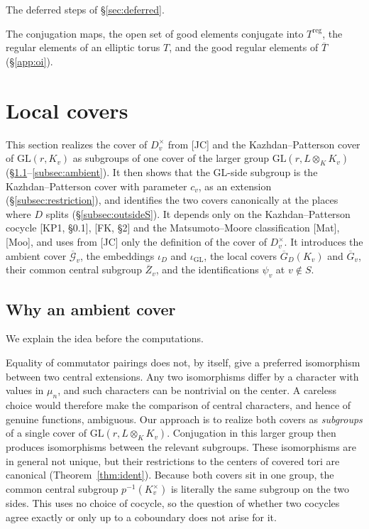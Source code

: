 \documentclass[12pt]{article}
\newcommand{\ov}[1]{\overline{#1}}
\newcommand{\reg}{\mathrm{reg}}
\newcommand{\GL}{\mathrm{GL}}
\newcommand{\Gb}{\ov{G}}
\newcommand{\Zb}{\ov{Z}}
\newcommand{\GDb}{\ov{G}_D}
\newcommand{\Tb}{\ov{T}}
\newcommand{\cGb}{\ov{\mathcal{G}}}
\newcommand{\iD}{\iota_D}
\newcommand{\iG}{\iota_{\GL}}
\theoremstyle{plain}
\theoremstyle{definition}
\begin{document}
\begin{description}[style=nextline,leftmargin=1.5em]
\item[(D1)--(D4)] The deferred steps of \S\ref{sec:deferred}.
\item[$\Psi$, $\tilde\Psi$, $\Gb_T$, $T^{\reg}$, $\Tb^{g,\reg}$] The conjugation maps, the open set of good elements conjugate into $T^{\reg}$, the regular elements of an elliptic torus $T$, and the good regular elements of $\Tb$ (\S\ref{app:oi}).
\end{description}

\section{Local covers}\label{sec:covers}
This section realizes the cover of $D_v^\times$ from [JC] and the Kazhdan--Patterson cover of $\GL(r,K_v)$ as subgroups of one cover of the larger group $\GL(r,L\otimes_KK_v)$ (\S\ref{subsec:why}--\ref{subsec:ambient}). It then shows that the $\GL$-side subgroup is the Kazhdan--Patterson cover with parameter $c_v$, as an extension (\S\ref{subsec:restriction}), and identifies the two covers canonically at the places where $D$ splits (\S\ref{subsec:outsideS}). It depends only on the Kazhdan--Patterson cocycle [KP1, \S0.1], [FK, \S2] and the Matsumoto--Moore classification [Mat], [Moo], and uses from [JC] only the definition of the cover of $D_v^\times$. It introduces the ambient cover $\cGb_v$, the embeddings $\iD$ and $\iG$, the local covers $\GDb(K_v)$ and $\Gb_v$, their common central subgroup $\Zb_v$, and the identifications $\psi_v$ at $v\notin S$.

\subsection{Why an ambient cover}\label{subsec:why}
We explain the idea before the computations.

Equality of commutator pairings does not, by itself, give a preferred isomorphism between two central extensions. Any two isomorphisms differ by a character with values in $\mu_n$, and such characters can be nontrivial on the center. A careless choice would therefore make the comparison of central characters, and hence of genuine functions, ambiguous. Our approach is to realize both covers as \emph{subgroups} of a single cover of $\GL(r,L\otimes_KK_v)$. Conjugation in this larger group then produces isomorphisms between the relevant subgroups. These isomorphisms are in general not unique, but their restrictions to the centers of covered tori are canonical (Theorem~\ref{thm:ident}). Because both covers sit in one group, the common central subgroup $p^{-1}(K_v^\times)$ is literally the same subgroup on the two sides. This uses no choice of cocycle, so the question of whether two cocycles agree exactly or only up to a coboundary does not arise for it.
\end{document}
